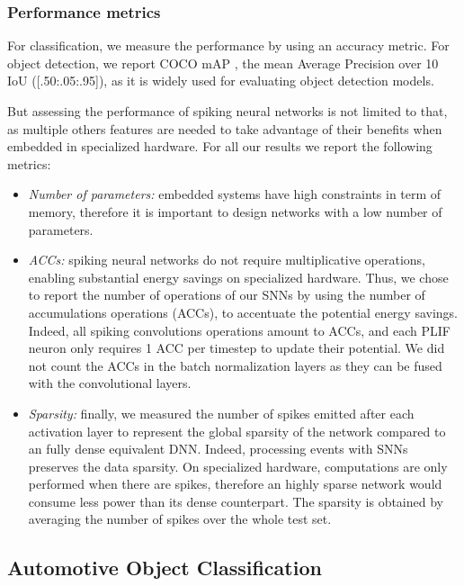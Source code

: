 \documentclass[conference]{IEEEtran}
\begin{document}
\subsubsection{Performance metrics}
For classification, we measure the performance by using an accuracy metric. For object detection, we report COCO mAP \cite{coco}, the mean Average Precision over 10 IoU ([.50:.05:.95]), as it is widely used for evaluating object detection models.

But assessing the performance of spiking neural networks is not limited to that, as multiple others features are needed to take advantage of their benefits when embedded in specialized hardware. For all our results we report the following metrics:
\begin{itemize}
    \item \textit{Number of parameters:} embedded systems have high constraints in term of memory, therefore it is important to design networks with a low number of parameters.
    \item \textit{ACCs:} spiking neural networks do not require multiplicative operations, enabling substantial energy savings on specialized hardware. Thus, we chose to report the number of operations of our SNNs by using the number of accumulations operations (ACCs), to accentuate the potential energy savings. Indeed, all spiking convolutions operations amount to ACCs, and each PLIF neuron only requires 1 ACC per timestep to update their potential. We did not count the ACCs in the batch normalization layers as they can be fused with the convolutional layers.
    \item \textit{Sparsity:} finally, we measured the number of spikes emitted after each activation layer to represent the global sparsity of the network compared to an fully dense equivalent DNN. Indeed, processing events with SNNs preserves the data sparsity. On specialized hardware, computations are only performed when there are spikes, therefore an highly sparse network would consume less power than its dense counterpart. The sparsity is obtained by averaging the number of spikes over the whole test set.
\end{itemize}

\subsection{Automotive Object Classification}
\end{document}

